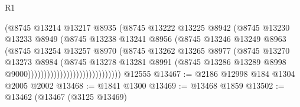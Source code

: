 \begin{lexlean}{R1}
\begin{coremodule}
                                          (@8745
                                            @13214
                                            @13217
                                            @8935
                                            (@8745
                                              @13222
                                              @13225
                                              @8942
                                              (@8745
                                                @13230
                                                @13233
                                                @8949
                                                (@8745
                                                  @13238
                                                  @13241
                                                  @8956
                                                  (@8745
                                                    @13246
                                                    @13249
                                                    @8963
                                                    (@8745
                                                      @13254
                                                      @13257
                                                      @8970
                                                      (@8745
                                                        @13262
                                                        @13265
                                                        @8977
                                                        (@8745
                                                          @13270
                                                          @13273
                                                          @8984
                                                          (@8745
                                                            @13278
                                                            @13281
                                                            @8991
                                                            (@8745
                                                              @13286
                                                              @13289
                                                              @8998
                                                              @9000)))))))))))))))))))))))))))))
    @12555
@13467 := @2186 @12998 @184 @1304 @2005 @2002
@13468 := @1841 @1300
@13469 := @13468 @1859
@13502 := @13462
    (@13467
      (@3125 @13469)

\end{coremodule}
\end{lexlean}
